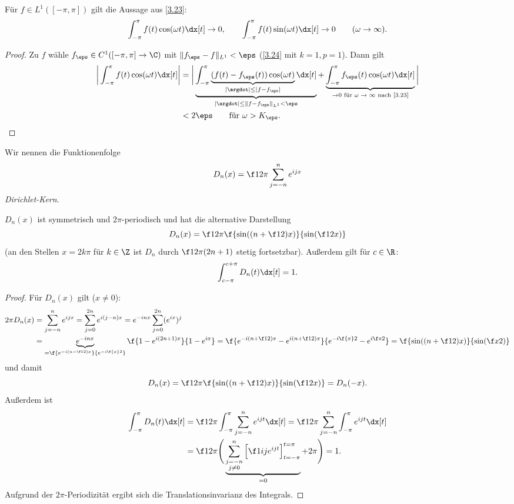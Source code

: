 \begin{st} \label{3.25}
	Für $f \in L^1([-\pi, \pi])$ gilt die Aussage aus \ref{3.23}:
	\[
		\int_{-\pi}^{\pi} f(t) \cos(\omega t) \dx[t] \to 0, \qquad
		\int_{-\pi}^{\pi} f(t) \sin(\omega t) \dx[t] \to 0 \qquad (\omega \to \infty).
	\]
	\begin{proof}
		Zu $f$ wähle $f_\eps \in C^1 ([-\pi,\pi] \to \C)$ mit $\|f_\eps - f\|_{L^1} < \eps$ (\ref{3.24} mit $k=1, p=1$).
		Dann gilt
		\begin{align*}
			\bigg|\int_{-\pi}^{\pi} f(t) \cos(\omega t) \dx[t] \bigg|
			&= \bigg| \underbrace{\int_{-\pi}^{\pi} \underbrace{(f(t) - f_\eps(t)) \cos(\omega t)}_{|\argdot| \le |f-f_\eps|} \dx[t]}_{|\argdot| \le \|f - f_\eps\|_{L^1} < \eps} + \underbrace{\int_{-\pi}^{\pi} f_\eps (t) \cos(\omega t) \dx[t]}_{\to 0 \text{ für $\omega \to \infty$ nach \ref{3.23}}} \bigg| \\
			&< 2\eps \qquad \text{für $\omega > K_\eps$.}
		\end{align*}
	\end{proof}
\end{st}

\begin{nt*}
	Wir nennen die Funktionenfolge
	\[
		D_n(x) = \f 1{2\pi} \sum_{j=-n}^n e^{ijx}
	\]
	\emph{Dirichlet-Kern}.

	$D_n(x)$ ist symmetrisch und $2\pi$-periodisch und hat die alternative Darstellung
	\[
		D_n(x) = \f 1{2\pi} \f {\sin((n+\f 12)x)}{\sin(\f 12 x)}
	\]
	(an den Stellen $x = 2k\pi$ für $k \in \Z$ ist $D_n$ durch $\f 1{2\pi} (2n + 1)$ stetig fortsetzbar).
	Außerdem gilt für $c \in \R$:
	\begin{align*}
		\int_{c-\pi}^{c+\pi} D_n(t) \dx[t] = 1.
	\end{align*}
	\begin{proof}
		Für $D_n(x)$ gilt ($x \neq 0$):
		\begin{align*}
			2\pi D_n(x)
			&= \sum_{j=-n}^n e^{ijx}
			= \sum_{j=0}^{2n} e^{i(j-n)x}
			= e^{-inx} \sum_{j=0}^{2n} (e^{ix})^{j} \\
			&= \underbrace{e^{-inx}}_{= \f {e^{-i(n-\f 12)x}}{e^{-i \f{x}2}}} \f {1- e^{i(2n+1)x}}{1- e^{ix}}
			= \f {e^{-i(n+\f 12)x} - e^{i (n+\f 12)x}}{e^{-i\f{x}2}-e^{i \f x 2}}
			= \f {\sin((n+ \f 12)x)}{\sin(\f x 2)}
		\end{align*}
		und damit
		\[
			D_n(x) = \f 1{2\pi} \f {\sin((n+\f 12)x)}{\sin(\f 12 x)} = D_n(-x).
		\]
		Außerdem ist
		\begin{align*}
			\int_{-\pi}^\pi D_n(t) \dx[t]
			&= \f 1{2\pi} \int_{-\pi}^\pi \sum_{j=-n}^n e^{ijt} \dx[t]
			= \f 1{2\pi} \sum_{j=-n}^n \int_{-\pi}^\pi e^{ijt} \dx[t] \\
			&= \f 1{2\pi} \Bigg( \underbrace{\sum_{\substack{j=-n \\ j\neq 0}}^n \Big[ \f 1{ij} e^{ijt} \Big]_{t=-\pi}^{t=\pi}}_{= 0} + 2\pi \Bigg)
			= 1.
		\end{align*}
		Aufgrund der $2\pi$-Periodizität ergibt sich die Translationsinvarianz des Integrals.
	\end{proof}
\end{nt*}

